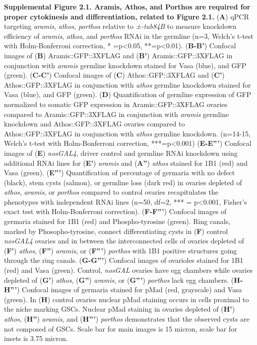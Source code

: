\documentclass[12pt,twoside]{reedthesis}
\begin{document}
\textbf{Supplemental Figure 2.1. Aramis, Athos, and Porthos are required for
proper cytokinesis and differentiation, related to Figure 2.1.} (\textbf{A})
qPCR targeting \emph{aramis}, \emph{athos}, \emph{porthos} relative to \emph{±-tub84B} to
measure knockdown efficiency of \emph{aramis}, \emph{athos}, and \emph{porthos} RNAi in
the germline (n=3, Welch's t-test with Holm-Bonferroni correction, *
=p\textless0.05, **=p\textless0.01). (\textbf{B-B'}) Confocal images of (\textbf{B})
Aramis::GFP::3XFLAG and (\textbf{B'}) Aramis::GFP::3XFLAG in conjunction with
\emph{aramis} germline knockdown stained for Vasa (blue), and GFP (green).
(\textbf{C-C'}) Confocal images of (\textbf{C}) Athos::GFP::3XFLAG and (\textbf{C'})
Athos::GFP::3XFLAG in conjunction with \emph{athos} germline knockdown
stained for Vasa (blue), and GFP (green). (\textbf{D}) Quantification of
germline expression of GFP normalized to somatic GFP expression in
Aramis::GFP::3XFLAG ovaries compared to Aramis::GFP::3XFLAG in
conjunction with \emph{aramis} germline knockdown and Athos::GFP::3XFLAG
ovaries compared to Athos::GFP::3XFLAG in conjunction with \emph{athos}
germline knockdown. (n=14-15, Welch's t-test with Holm-Bonferroni
correction, ***=p\textless0.001) (\textbf{E-E'''}) Confocal images of (\textbf{E})
\emph{nosGAL4}, driver control and germline RNAi knockdown using additional
RNAi lines for (\textbf{E'}) \emph{aramis} and (\textbf{A''}) \emph{athos} stained for 1B1
(red) and Vasa (green). (\textbf{E'''}) Quantification of percentage of
germaria with no defect (black), stem cysts (salmon), or germline loss
(dark red) in ovaries depleted of \emph{athos}, \emph{aramis}, or \emph{porthos}
compared to control ovaries recapitulates the phenotypes with
independent RNAi lines (n=50, df=2, *** = p\textless0.001, Fisher's exact
test with Holm-Bonferroni correction). (\textbf{F-F'''}) Confocal images of
germaria stained for 1B1 (red) and Phospho-tyrosine (green). Ring
canals, marked by Phosopho-tyrosine, connect differentiating cysts in
(\textbf{F}) control \emph{nosGAL4} ovaries and in between the interconnected
cells of ovaries depleted of (\textbf{F'}) \emph{athos}, (\textbf{F''}) \emph{aramis}, or
(\textbf{F'''}) \emph{porthos} with 1B1 positive structures going through the ring
canals. (\textbf{G-G'''}) Confocal images of ovarioles stained for 1B1 (red)
and Vasa (green). Control, \emph{nosGAL} ovaries have egg chambers while
ovaries depleted of (\textbf{G'}) \emph{athos}, (\textbf{G''}) \emph{aramis}, or (\textbf{G'''})
\emph{porthos} lack egg chambers. (\textbf{H-H'''}) Confocal images of germaria
stained for pMad (red, grayscale) and Vasa (green). In (\textbf{H}) control
ovaries nuclear pMad staining occurs in cells proximal to the niche
marking GSCs. Nuclear pMad staining in ovaries depleted of (\textbf{H'})
\emph{athos}, (\textbf{H''}) \emph{aramis}, and (\textbf{H'''}) \emph{porthos} demonstrates that
the observed cysts are not composed of GSCs. Scale bar for main images
is 15 micron, scale bar for insets is 3.75 micron.
\end{document}
